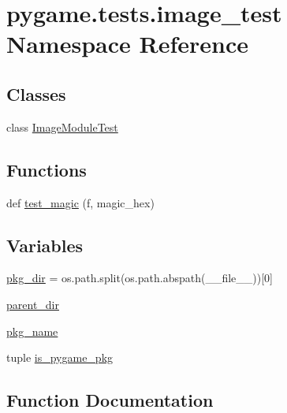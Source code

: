 \hypertarget{namespacepygame_1_1tests_1_1image__test}{}\section{pygame.\+tests.\+image\+\_\+test Namespace Reference}
\label{namespacepygame_1_1tests_1_1image__test}
\subsection*{Classes}
\begin{DoxyCompactItemize}
\item 
class \hyperlink{classpygame_1_1tests_1_1image__test_1_1_image_module_test}{Image\+Module\+Test}
\end{DoxyCompactItemize}
\subsection*{Functions}
\begin{DoxyCompactItemize}
\item 
def \hyperlink{namespacepygame_1_1tests_1_1image__test_a3d1d3d2999623eddb558118200de3373}{test\+\_\+magic} (f, magic\+\_\+hex)
\end{DoxyCompactItemize}
\subsection*{Variables}
\begin{DoxyCompactItemize}
\item 
\hyperlink{namespacepygame_1_1tests_1_1image__test_a4981f308c4ce241f5c007668b02c27c9}{pkg\+\_\+dir} = os.\+path.\+split(os.\+path.\+abspath(\+\_\+\+\_\+file\+\_\+\+\_\+))\mbox{[}0\mbox{]}
\item 
\hyperlink{namespacepygame_1_1tests_1_1image__test_a3d0c9598c3e3b778aa7b21bca6373724}{parent\+\_\+dir}
\item 
\hyperlink{namespacepygame_1_1tests_1_1image__test_ac437df27dced763bbf04ee509c6f1093}{pkg\+\_\+name}
\item 
tuple \hyperlink{namespacepygame_1_1tests_1_1image__test_a200e61dc67c52d71c68b75ec44cfa808}{is\+\_\+pygame\+\_\+pkg}
\end{DoxyCompactItemize}


\subsection{Function Documentation}
\mbox{\label{namespacepygame_1_1tests_1_1image__test_a3d1d3d2999623eddb558118200de3373}} 
